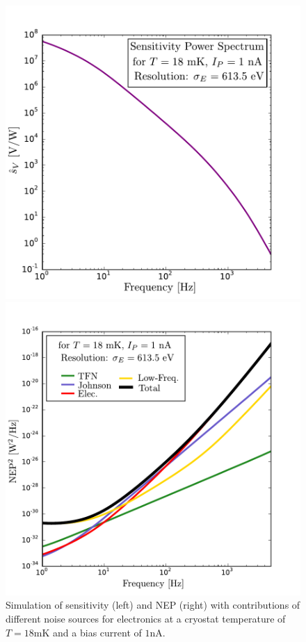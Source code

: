 \begin{figure}[!ht]
\begin{minipage}{0.49\textwidth}
\includegraphics[width=\textwidth]{Figures/Ethem/sv_fin.pdf}
\end{minipage}
\hfill
\begin{minipage}{0.49\textwidth}
\includegraphics[width=\textwidth]{Figures/Ethem/nep_fin.pdf}
\end{minipage}
\caption{Simulation of sensitivity (left) and NEP (right) with contributions of different noise sources for \Edelweiss{} electronics at a cryostat temperature of $T=18$mK and a bias current of $1$nA.}
\label{fig:nep-fig}
\end{figure}


